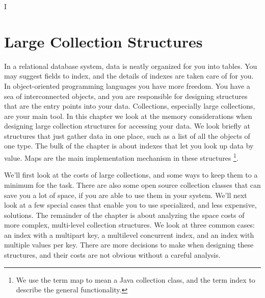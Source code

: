 I\chapter{Large Collection Structures}
\label{chapter:tables-indexes}

In a relational database system, data is neatly organized for you into tables.
You may suggest fields to index, and the details of indexes are
taken care of for you. In object-oriented programming languages
you have more freedom. You have a sea of interconnected objects, and you are responsible for designing structures that are the entry points into your
data. Collections, especially large collections, are your
main tool. In this chapter we look at the memory considerations when
designing large collection structures for accessing your
data. We look briefly
at structures that just gather data in one place, such as a list
of all the objects of one type. The bulk of the chapter is about indexes
that let you look up data by value. Maps are the main implementation
mechanism in these structures \footnote{We use the term map to mean a Java collection class,
and the term index to describe the general functionality.}. 

We'll first look at the costs of large collections, and some ways to keep them
to a minimum for the task. There are also some open source
collection classes that can save you a lot of space, if you are able to use them in your system. 
We'll next look at a few special cases that enable you to use
specialized, and less expensive, solutions. The remainder of the chapter is
about analyzing the space costs of more complex, multi-level collection
structures.  We look at three common cases: an index with a multipart key, a
multilevel concurrent index, and an index with multiple values per key. There are more decisions
to make when designing these structures, and their costs are
not obvious without a careful analysis. 





